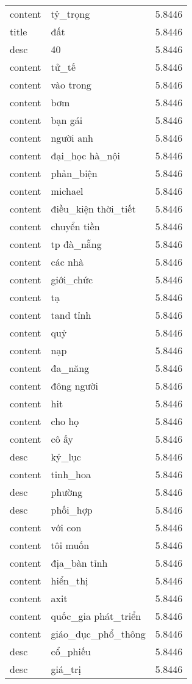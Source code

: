 \documentclass{article}
\begin{document}
\begin{tabular}{lll}
content & tỷ\_trọng & 5.8446\\
title & đất & 5.8446\\
desc & 40 & 5.8446\\
content & tử\_tế & 5.8446\\
content & vào trong & 5.8446\\
content & bơm & 5.8446\\
content & bạn gái & 5.8446\\
content & người anh & 5.8446\\
content & đại\_học hà\_nội & 5.8446\\
content & phản\_biện & 5.8446\\
content & michael & 5.8446\\
content & điều\_kiện thời\_tiết & 5.8446\\
content & chuyển tiền & 5.8446\\
content & tp đà\_nẵng & 5.8446\\
content & các nhà & 5.8446\\
content & giới\_chức & 5.8446\\
content & tạ & 5.8446\\
content & tand tỉnh & 5.8446\\
content & quỷ & 5.8446\\
content & nạp & 5.8446\\
content & đa\_năng & 5.8446\\
content & đông người & 5.8446\\
content & hit & 5.8446\\
content & cho họ & 5.8446\\
content & cô ấy & 5.8446\\
desc & kỷ\_lục & 5.8446\\
content & tinh\_hoa & 5.8446\\
desc & phường & 5.8446\\
desc & phối\_hợp & 5.8446\\
content & với con & 5.8446\\
content & tôi muốn & 5.8446\\
content & địa\_bàn tỉnh & 5.8446\\
content & hiển\_thị & 5.8446\\
content & axit & 5.8446\\
content & quốc\_gia phát\_triển & 5.8446\\
content & giáo\_dục\_phổ\_thông & 5.8446\\
desc & cổ\_phiếu & 5.8446\\
desc & giá\_trị & 5.8446\\

\end{tabular}
\end{document}
